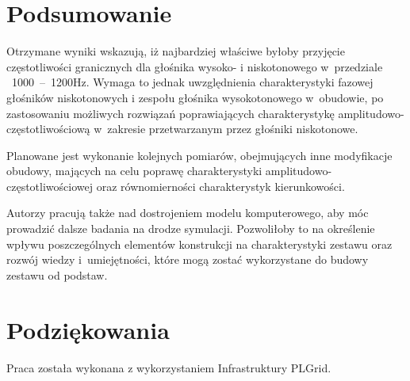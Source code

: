\documentclass[12pt]{oska}
\newcommand{\range}[2]{\num{#1}~--~\num{#2}}
\begin{document}
	\newpage
	\section{Podsumowanie}
	
	Otrzymane wyniki wskazują, iż najbardziej właściwe byłoby przyjęcie częstotliwości granicznych dla głośnika wysoko- i niskotonowego w~przedziale ~\range{1000}{1200}\si{Hz}. Wymaga to jednak uwzględnienia charakterystyki fazowej głośników niskotonowych i zespołu głośnika wysokotonowego w~obudowie, po zastosowaniu możliwych rozwiązań poprawiających charakterystykę amplitudowo-częstotliwościową w~zakresie przetwarzanym przez głośniki niskotonowe. 
	
	Planowane jest wykonanie kolejnych pomiarów, obejmujących inne modyfikacje obudowy, mających na celu poprawę charakterystyki amplitudowo-częstotliwościowej oraz równomierności charakterystyk kierunkowości. 
	
	Autorzy pracują także nad dostrojeniem modelu komputerowego, aby móc prowadzić dalsze badania na drodze symulacji. Pozwoliłoby to na określenie wpływu poszczególnych elementów konstrukcji na charakterystyki zestawu oraz rozwój wiedzy i~umiejętności, które mogą zostać wykorzystane do budowy zestawu od podstaw. 
	
	\section*{Podziękowania}
	
	Praca została wykonana z wykorzystaniem Infrastruktury PLGrid.
	
	
	\printbibliography
	
\end{document}
